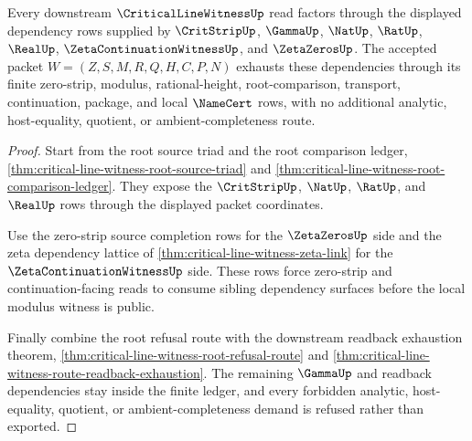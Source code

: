 \begin{theorem}
\label{thm:critical-line-witness-dependency-ledger-exhaustion}
Every downstream $\CriticalLineWitnessUp$ read factors through the displayed dependency rows supplied by $\CritStripUp$, $\GammaUp$, $\NatUp$, $\RatUp$, $\RealUp$, $\ZetaContinuationWitnessUp$, and $\ZetaZerosUp$. The accepted packet $W=(Z,S,M,R,Q,H,C,P,N)$ exhausts these dependencies through its finite zero-strip, modulus, rational-height, root-comparison, transport, continuation, package, and local $\NameCert$ rows, with no additional analytic, host-equality, quotient, or ambient-completeness route.
\end{theorem}
\begin{proof}
Start from the root source triad and the root comparison ledger, \autoref{thm:critical-line-witness-root-source-triad} and \autoref{thm:critical-line-witness-root-comparison-ledger}. They expose the $\CritStripUp$, $\NatUp$, $\RatUp$, and $\RealUp$ rows through the displayed packet coordinates.

Use the zero-strip source completion rows for the $\ZetaZerosUp$ side and the zeta dependency lattice of \autoref{thm:critical-line-witness-zeta-link} for the $\ZetaContinuationWitnessUp$ side. These rows force zero-strip and continuation-facing reads to consume sibling dependency surfaces before the local modulus witness is public.

Finally combine the root refusal route with the downstream readback exhaustion theorem, \autoref{thm:critical-line-witness-root-refusal-route} and \autoref{thm:critical-line-witness-route-readback-exhaustion}. The remaining $\GammaUp$ and readback dependencies stay inside the finite ledger, and every forbidden analytic, host-equality, quotient, or ambient-completeness demand is refused rather than exported.
\end{proof}

